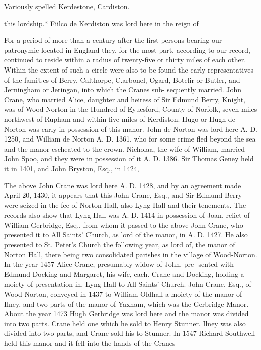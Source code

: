\documentclass[oneside]{book}
\begin{document}
Variously spelled Kerdestone, Cardiston. 




this lordship.* Fiilco de Kerdiston was lord here in the reign of 

For a period of more than a century after the first persons 
bearing our patronymic located in England they, for the most 
part, according to our record, continued to reside within a radius 
of twenty-five or thirty miles of each other. Within the extent 
of such a circle were also to be found the early representatives of 
the famiUes of Berry, Calthorpe, C.arbonel, Ogard, Botelir or 
Butler, and Jerningham or Jeringan, into which the Cranes sub- 
sequently married. John Crane, who married Alice, daughter 
and heiress of Sir Edmund Berry, Knight, was of Wood-Norton 
in the Hundred of Eyuesford, County of Norfolk, seven miles 
northwest of Rupham and within five miles of Kerdiston. Hugo 
or Hugh de Norton was early in possession of this manor. John 
de Norton was lord here A. D. 1250, and William de Norton A. 
D. 1361, who for some crime fled beyond the sea and the manor 
escheated to the crown. Nicholaa, the wife of William, married 
John Spoo, and they were in possession of it A. D. 1386. Sir 
Thomas Geney held it in 1401, and John Bryston, Esq., in 1424, 

The above John Crane was lord here A. D. 1428, and by an 
agreement made April 20, 1430, it appears that this John Crane, 
Esq., and Sir Edmund Berry were seized in the fee of Norton 
Hall, also Lyng Hall and their tenements. The records also 
show that Lyng Hall was A. D. 1414 in possession of Joan, relict 
of William Gerbridge, Esq., from whom it passed to the above 
John Crane, who presented it to All Saints' Church, as lord of the 
manor, in A. D. 1427. He also presented to St. Peter's Church 
the following year, as lord of, the manor of Norton Hall, there 
being two consolidated parishes in the village of Wood-Norton. 
In the year 1457 Alice Crane, presumably widow of John, pre- 
sented with Edmund Docking and Margaret, his wife, each. 
Crane and Docking, holding a moiety of presentation in, Lyng 
Hall to All Saints' Church. John Crane, Esq., of Wood-Norton, 
conveyed in 1437 to William Oldhall a moiety of the manor of 
Ilney, and two parts of the manor of Yaxham, which was the 
Gerbridge Manor. About the year 1473 Hugh Gerbridge was 
lord here and the manor was divided into two parts. Crane held 
one which he sold to Henry Stunner. Ilney was also divided 
into two parts, and Crane sold his to Stunner. In 1547 Richard 
Southwell held this manor and it fell into the hands of the Cranes 
\end{document}

